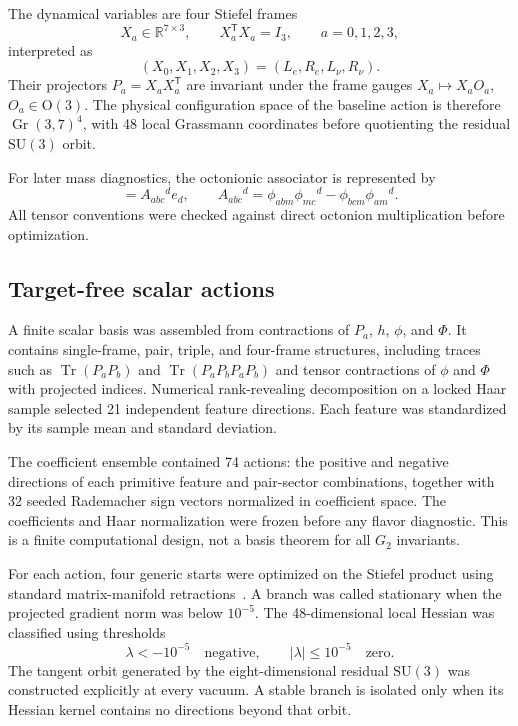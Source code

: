 \documentclass[11pt]{article}
\newcommand{\Gr}{\operatorname{Gr}}
\newcommand{\Tr}{\operatorname{Tr}}
\newcommand{\SU}{\mathrm{SU}}
\newcommand{\OO}{\mathrm{O}}
\begin{document}
The dynamical variables are four Stiefel frames
\begin{equation}
  X_a\in\mathbb R^{7\times 3},\qquad X_a^{\mathsf T}X_a=I_3,
  \qquad a=0,1,2,3,
\end{equation}
interpreted as
\begin{equation}
  (X_0,X_1,X_2,X_3)=(L_e,R_e,L_\nu,R_\nu).
\end{equation}
Their projectors $P_a=X_aX_a^{\mathsf T}$ are invariant under the frame gauges $X_a\mapsto X_aO_a$, $O_a\in\OO(3)$.  The physical configuration space of the baseline action is therefore $\Gr(3,7)^4$, with 48 local Grassmann coordinates before quotienting the residual $\SU(3)$ orbit.

For later mass diagnostics, the octonionic associator is represented by
\begin{equation}
  [e_a,e_b,e_c]=A_{abc}{}^d e_d,
  \qquad
  A_{abc}{}^d
  =\phi_{abm}\phi_{mc}{}^d-\phi_{bcm}\phi_{am}{}^d.
  \label{eq:associator}
\end{equation}
All tensor conventions were checked against direct octonion multiplication before optimization.

\subsection{Target-free scalar actions}

A finite scalar basis was assembled from contractions of $P_a$, $h$, $\phi$, and $\Phi$.  It contains single-frame, pair, triple, and four-frame structures, including traces such as $\Tr(P_aP_b)$ and $\Tr(P_aP_bP_aP_b)$ and tensor contractions of $\phi$ and $\Phi$ with projected indices.  Numerical rank-revealing decomposition on a locked Haar sample selected 21 independent feature directions.  Each feature was standardized by its sample mean and standard deviation.

The coefficient ensemble contained 74 actions: the positive and negative directions of each primitive feature and pair-sector combinations, together with 32 seeded Rademacher sign vectors normalized in coefficient space.  The coefficients and Haar normalization were frozen before any flavor diagnostic.  This is a finite computational design, not a basis theorem for all $G_2$ invariants.

For each action, four generic starts were optimized on the Stiefel product using standard matrix-manifold retractions~\cite{AbsilMahonySepulchre2008}.  A branch was called stationary when the projected gradient norm was below $10^{-5}$.  The 48-dimensional local Hessian was classified using thresholds
\begin{equation}
  \lambda<-10^{-5}\quad\text{negative},\qquad
  |\lambda|\le 10^{-5}\quad\text{zero}.
  \label{eq:hessian-thresholds}
\end{equation}
The tangent orbit generated by the eight-dimensional residual $\SU(3)$ was constructed explicitly at every vacuum.  A stable branch is isolated only when its Hessian kernel contains no directions beyond that orbit.
\end{document}
